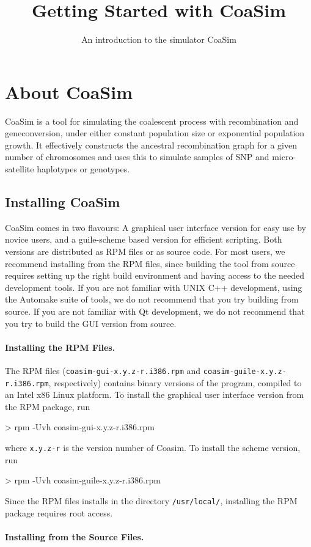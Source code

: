 \documentclass{manual}
\title{Getting Started with CoaSim}
\subtitle{An introduction to the simulator CoaSim}
\begin{document}
\section{About CoaSim}

CoaSim is a tool for simulating the coalescent process with
recombination and geneconversion, under either constant population
size or exponential population growth.  It effectively constructs the
ancestral recombination graph for a given number of chromosomes and
uses this to simulate samples of SNP and micro-satellite haplotypes or
genotypes.

\subsection{Installing CoaSim}

CoaSim comes in two flavours: A graphical user interface version for
easy use by novice users, and a guile-scheme based version for
efficient scripting.  Both versions are distributed as RPM files or as
source code.  For most users, we recommend installing from the RPM
files, since building the tool from source requires setting up the
right build environment and having access to the needed development
tools.  If you are not familiar with UNIX C++ development, using the
Automake suite of tools, we do not recommend that you try building
from source.  If you are not familiar with Qt development, we do not
recommend that you try to build the GUI version from source.

\paragraph{Installing the RPM Files.}

The RPM files (\verb?coasim-gui-x.y.z-r.i386.rpm? and
\verb?coasim-guile-x.y.z-r.i386.rpm?, respectively) contains binary
versions of the program, compiled to an Intel x86 Linux platform.  To
install the graphical user interface version from the RPM package, run
\begin{code}
> rpm -Uvh coasim-gui-x.y.z-r.i386.rpm
\end{code}
where \texttt{x.y.z-r} is the version number of Coasim.  To install
the scheme version, run
\begin{code}
> rpm -Uvh coasim-guile-x.y.z-r.i386.rpm
\end{code}
Since the RPM files installs in the directory \verb?/usr/local/?,
installing the RPM package requires root access.

\paragraph{Installing from the Source Files.}
\end{document}
